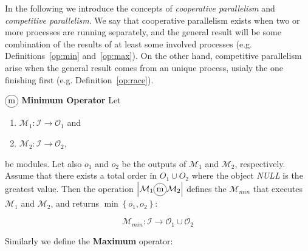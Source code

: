 In the following we introduce the concepts of {\it cooperative parallelism} and {\it competitive parallelism}. We say that cooperative parallelism exists when two or more processes are running separately, and the general result will be some combination of the results of at least some involved processes (e.g. Definitions~\ref{op:min} and~\ref{op:max}). On the other hand, competitive parallelism arise when the general result comes from an unique process, usialy the one finishing first (e.g. Definition~\ref{op:race}).


\begin{definition}\label{op:min}
$\circled{m}$ {\bf Minimum Operator } Let
\begin{enumerate}%
	\item $\mathcal{M}_1 : \mathcal{I} \rightarrow \mathcal{O}_1$ and  
	\item $\mathcal{M}_2 : \mathcal{I} \rightarrow \mathcal{O}_2$,
\end{enumerate}%
be modules. %
Let also $o_1$ and $o_2$ be the outputs of $\mathcal{M}_1$ and $\mathcal{M}_2$, respectively. Assume that there exists a total order in $O_1 \cup O_2$ where the object \emph{NULL} is the greatest value. Then the operation $\left|\mathcal{M}_1\circled{m}\mathcal{M}_2\right|$ defines the \cm{} $\mathcal{M}_{min}$ that executes $\mathcal{M}_1$ and $\mathcal{M}_2$, and returns $\min\left\{o_1,o_2\right\}$:

\[
\mathcal{M}_{min}:\mathcal{I} \rightarrow \mathcal{O}_1 \cup \mathcal{O}_2 
\]
\end{definition}

\separation

Similarly we define the \textbf{Maximum} operator:



